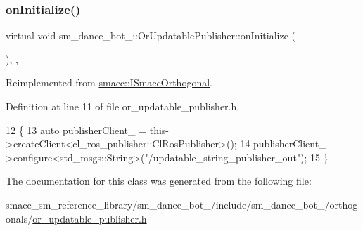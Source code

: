 \subsubsection{\texorpdfstring{on\+Initialize()}{onInitialize()}}
{\footnotesize\ttfamily virtual void sm\+\_\+dance\+\_\+bot\+\_\+::\+Or\+Updatable\+Publisher\+::on\+Initialize (\begin{DoxyParamCaption}{ }\end{DoxyParamCaption})\hspace{0.3cm}{\ttfamily [inline]}, {\ttfamily [override]}, {\ttfamily [virtual]}}



Reimplemented from \hyperlink{classsmacc_1_1ISmaccOrthogonal_a6bb31c620cb64dd7b8417f8705c79c7a}{smacc\+::\+I\+Smacc\+Orthogonal}.



Definition at line 11 of file or\+\_\+updatable\+\_\+publisher.\+h.


\begin{DoxyCode}
12     \{
13         \textcolor{keyword}{auto} publisherClient\_ = this->createClient<cl\_ros\_publisher::ClRosPublisher>();
14         publisherClient\_->configure<std\_msgs::String>(\textcolor{stringliteral}{"/updatable\_string\_publisher\_out"});
15     \}
\end{DoxyCode}


The documentation for this class was generated from the following file\+:\begin{DoxyCompactItemize}
\item 
smacc\+\_\+sm\+\_\+reference\+\_\+library/sm\+\_\+dance\+\_\+bot\+\_/include/sm\+\_\+dance\+\_\+bot\+\_/orthogonals/\hyperlink{sm__dance__bot__2_2include_2sm__dance__bot__2_2orthogonals_2or__updatable__publisher_8h}{or\+\_\+updatable\+\_\+publisher.\+h}\end{DoxyCompactItemize}
